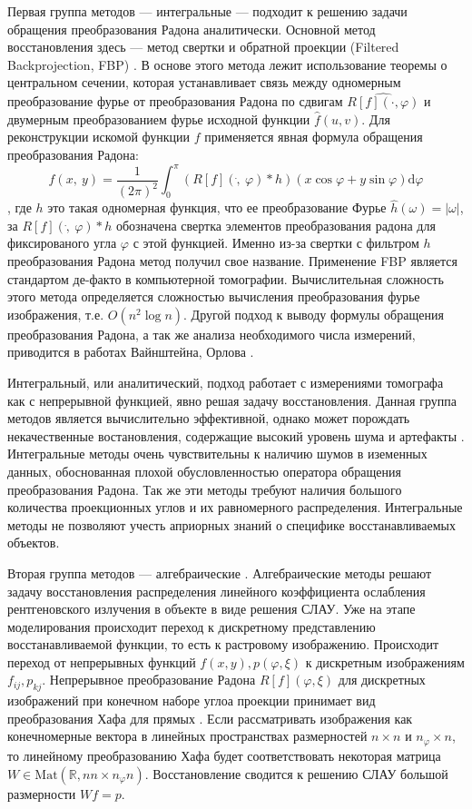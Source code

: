 Первая группа методов --- интегральные \cite{herman2013mathematical, hsieh2009computed}  --- подходит к решению задачи обращения преобразования Радона аналитически. 
Основной метод восстановления здесь --- метод свертки и обратной проекции (Filtered Backprojection, FBP) \cite{buzug2008computed}.
В основе этого метода лежит использование теоремы о центральном сечении, которая устанавливает связь между одномерным преобразование фурье от преобразования Радона по сдвигам $\hat{R[f](\cdot, \varphi)}$ и двумерным преобразованием фурье исходной функции $\hat{f}(u, v)$.
Для реконструкции искомой функции $f$ применяется явная формула обращения преобразования Радона:
$$
f(x,\ y) = \frac {1} {(2 \pi)^2} \int_0^\pi {
  \left(R[f](\dot,\ \varphi) * h\right)(x \cos \varphi + y \sin \varphi)
} \mathrm d \varphi
$$,
где $h$ это такая одномерная функция, что ее преобразование Фурье $\hat{h}(\omega) = |\omega|$, за $R[f](\dot,\ \varphi) * h$ обозначена свертка элементов преобразования радона для фиксированого угла $\varphi$ с этой функцией.
Именно из-за свертки с фильтром $h$ преобразования Радона метод получил свое название.
Применение FBP является стандартом де-факто в компьютерной томографии.
Вычислительная сложность этого метода определяется сложностью вычисления преобразования фурье изображения, т.е. $O(n^2 \log n)$.
Другой подход к выводу формулы обращения преобразования Радона, а так же анализа необходимого числа измерений, приводится в работах Вайнштейна, Орлова \cite{vainstein_orlov, orlov}.

Интегральный, или аналитический, подход работает с измерениями томографа как с непрерывной функцией, явно решая задачу восстановления.
Данная группа методов является вычислительно эффективной, однако может порождать некачественные востановления, содержащие высокий уровень шума и артефакты \cite{Lucas_sota_ir_survey_2015_radiology}.
Интегральные методы очень чувствительны к наличию шумов в иземенных данных, обоснованная плохой обусловленностью оператора обращения преобразования Радона. 
Так же эти методы требуют наличия большого количества проекционных углов и их равномерного распределения.
Интегральные методы не позволяют учесть априорных знаний о специфике восстанавливаемых объектов.


Вторая группа методов --- алгебраические \cite{algebraic_methods}. 
Алгебраические методы решают задачу восстановления распределения линейного коэффициента ослабления рентгеновского излучения в объекте в виде решения СЛАУ.
Уже на этапе моделирования происходит переход к дискретному представлению восстанавливаемой функции, то есть к растровому изображению.
Происходит переход от непрерывных функций $f(x,y), p(\varphi, \xi)$ к дискретным изображениям $f_{ij}, p_{kj}$.
Непрерывное преобразование Радона $R[f](\varphi, \xi)$ для дискретных изображений при конечном наборе углоа проекции принимает вид преобразования Хафа для прямых \cite{Ginkel04ashort}.
Если рассматривать изображения как конечномерные вектора в линейных пространствах размерностей $n \times n$ и $n_\varphi \times n$, то линейному преобразованию Хафа будет соответствовать некоторая матрица $W \in \mathrm{Mat}(\mathbb R, n n \times n_\varphi n)$.
Восстановление сводится к решению СЛАУ большой размерности $Wf = p$.

